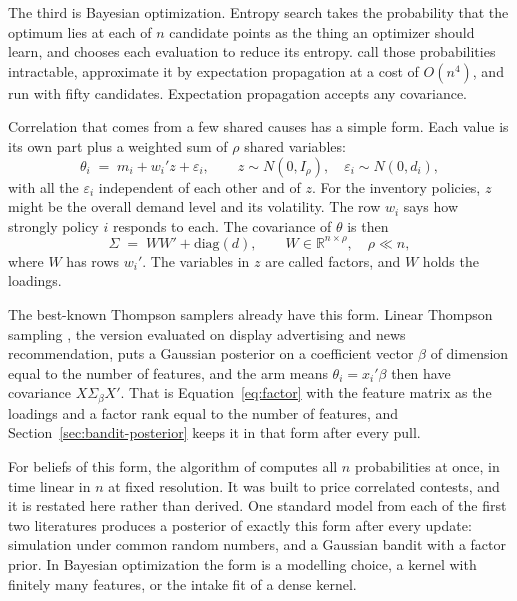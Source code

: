\documentclass[11pt]{article}
\begin{document}
The third is Bayesian optimization. Entropy search
\citep{hennig2012} takes the probability that the optimum lies at each of $n$ candidate points as the thing an optimizer should learn, and chooses each evaluation to reduce its
entropy. \citet{hennig2012} call those probabilities intractable, approximate
it by expectation propagation at a cost of $O(n^4)$, and run with fifty candidates. Expectation propagation accepts any
covariance.

Correlation that comes from a few shared causes has a simple form.
Each value is its own part plus a weighted sum of $\rho$ shared
variables:
\begin{equation}
\theta_i \;=\; m_i + w_i' z + \varepsilon_i, \qquad
z \sim N(0, I_\rho), \quad \varepsilon_i \sim N(0, d_i),
\label{eq:factormodel}
\end{equation}
with all the $\varepsilon_i$ independent of each other and of $z$. For
the inventory policies, $z$ might be the overall demand level and its
volatility. The row $w_i$ says how strongly policy $i$ responds to each.
The covariance of $\theta$ is then
\begin{equation}
\Sigma \;=\; W W' + \mathrm{diag}(d), \qquad W \in
\mathbb{R}^{n \times \rho}, \quad \rho \ll n,
\label{eq:factor}
\end{equation}
where $W$ has rows $w_i'$. The variables in $z$ are called factors,
and $W$ holds the loadings.

The best-known Thompson samplers already have this form. Linear Thompson
sampling \citep{agrawal2013}, the version \citet{chapelle2011}
evaluated on display advertising and news recommendation, puts a
Gaussian posterior on a coefficient vector $\beta$ of dimension equal
to the number of features, and the arm means $\theta_i = x_i' \beta$
then have covariance $X \Sigma_\beta X'$. That is Equation~\eqref{eq:factor}
with the feature matrix as the loadings and a factor rank equal to
the number of features, and Section~\ref{sec:bandit-posterior} keeps
it in that form after every pull.

For beliefs of this form, the algorithm of \citet{cotton2026}
computes all $n$ probabilities at once, in time linear in $n$ at
fixed resolution. It was built to price correlated contests, and it is
restated here rather than derived. One standard model from each of the first two literatures produces a
posterior of exactly this form after every update: simulation under
common random numbers, and a Gaussian bandit with a factor prior. In Bayesian optimization the form is a modelling choice, a kernel
with finitely many features, or the intake fit of a dense kernel.
\end{document}
